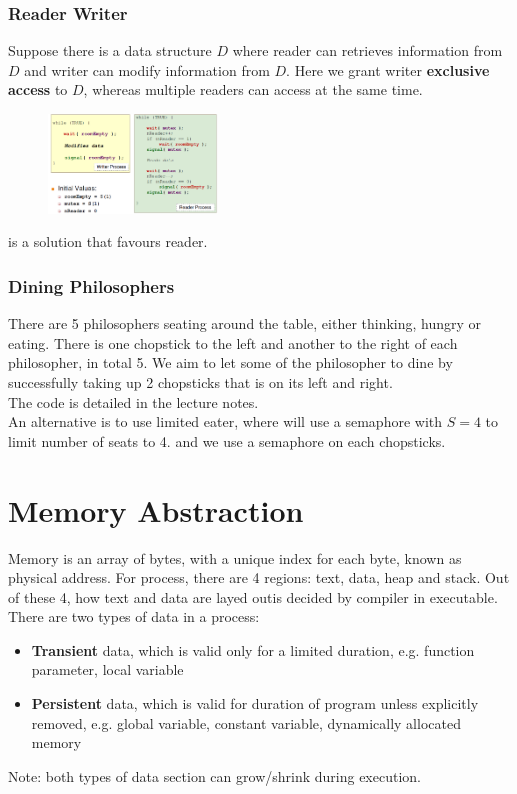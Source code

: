 \documentclass[12pt]{article}
\theoremstyle{definition}
\begin{document}
\subsubsection{Reader Writer}
Suppose there is a data structure $D$ where reader can retrieves information from $D$ and writer can modify information from $D$. Here we grant writer \textbf{exclusive access} to $D$, whereas multiple readers can access at the same time.
\begin{figure}[h]
\centering
\includegraphics[width=0.4\textwidth]{5_2.png}
\end{figure}
is a solution that favours reader.
\subsubsection{Dining Philosophers}
There are 5 philosophers seating around the table, either thinking, hungry or eating. There is one chopstick to the left and another to the right of each philosopher, in total 5. We aim to let some of the philosopher to dine by successfully taking up 2 chopsticks that is on its left and right.\\
The code is detailed in the lecture notes.\\
An alternative is to use limited eater, where will use a semaphore with $S=4$ to limit number of seats to 4. and we use a semaphore on each chopsticks.

\section{Memory Abstraction}
Memory is an array of bytes, with a unique index for each byte, known as physical address. For process, there are 4 regions: text, data, heap and stack. Out of these 4, how text and data are layed outis decided by compiler in executable.\\
There are two types of data in a process:
\begin{itemize}
  \item \textbf{Transient} data, which is valid only for a limited duration, e.g. function parameter, local variable
  \item \textbf{Persistent} data, which is valid for duration of program unless explicitly removed, e.g. global variable, constant variable, dynamically allocated memory
\end{itemize}
Note: both types of data section can grow/shrink during execution.
\end{document}
